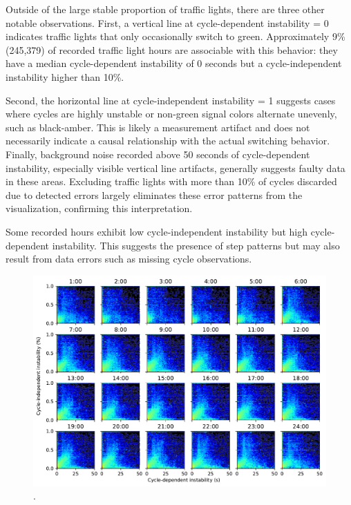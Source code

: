 Outside of the large stable proportion of traffic lights, there are three other notable observations. First, a vertical line at cycle-dependent instability = 0 indicates traffic lights that only occasionally switch to green. Approximately 9\% (245,379) of recorded traffic light hours are associable with this behavior: they have a median cycle-dependent instability of 0 seconds but a cycle-independent instability higher than 10\%. 

Second, the horizontal line at cycle-independent instability = 1 suggests cases where cycles are highly unstable or non-green signal colors alternate unevenly, such as black-amber. This is likely a measurement artifact and does not necessarily indicate a causal relationship with the actual switching behavior. Finally, background noise recorded above 50 seconds of cycle-dependent instability, especially visible vertical line artifacts, generally suggests faulty data in these areas. Excluding traffic lights with more than 10\% of cycles discarded due to detected errors largely eliminates these error patterns from the visualization, confirming this interpretation.

Some recorded hours exhibit low cycle-independent instability but high cycle-dependent instability. This suggests the presence of step patterns but may also result from data errors such as missing cycle observations.

\begin{figure}[ht]
    \centering
    \includegraphics[width=\linewidth]{images/predictability-heatmap-hourly.pdf}
    \caption{.}\label{fig:predictability-heatmap-hourly}
\end{figure}

